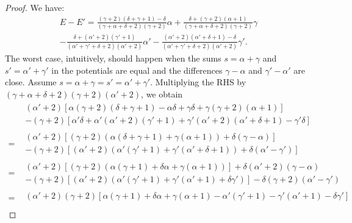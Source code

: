 \documentclass[version=3.21, pagesize, twoside=off, bibliography=totoc, DIV=calc, fontsize=12pt, a4paper]{scrartcl}
\begin{document}
\begin{proof}
	We have:
	\begin{multline}
		E - E' = \frac{(\gamma + 2) (\delta + \gamma + 1) - \delta}{(\gamma + \alpha + \delta + 2) (\gamma + 2)} \alpha 
		+ \frac{\delta + (\gamma + 2) (\alpha + 1)}{(\gamma + \alpha + \delta + 2) (\gamma + 2)} \gamma \\
		- \frac{\delta + (\alpha' + 2) (\gamma' + 1)}{(\alpha' + \gamma' + \delta + 2) (\alpha' + 2)} \alpha' 
		- \frac{(\alpha' + 2) (\alpha' + \delta + 1) - \delta}{(\alpha' + \gamma' + \delta + 2) (\alpha' + 2)} \gamma'.
	\end{multline}
	The worst case, intuitively, should happen when the sums $s = \alpha + \gamma$ and $s' = \alpha' + \gamma'$ in the potentials are equal and the differences $\gamma - \alpha$ and $\gamma' - \alpha'$ are close.
	Assume $s = \alpha + \gamma = s' = \alpha' + \gamma'$.
	Multiplying the RHS by $(\gamma + \alpha + \delta + 2) (\gamma + 2) (\alpha' + 2)$, we obtain
	\begin{align}
		& \begin{split}
			(\alpha' + 2) [\alpha (\gamma + 2) (\delta + \gamma + 1) - \alpha \delta + \gamma \delta + \gamma (\gamma + 2) (\alpha + 1)]\\
			- (\gamma + 2) [\alpha' \delta + \alpha' (\alpha' + 2) (\gamma' + 1) + \gamma' (\alpha' + 2) (\alpha' + \delta + 1) - \gamma' \delta]
		\end{split}\\
		= {} & \begin{split}
			(\alpha' + 2) [(\gamma + 2) (\alpha (\delta + \gamma + 1) + \gamma (\alpha + 1)) + \delta (\gamma - \alpha)]\\
			- (\gamma + 2) [(\alpha' + 2) (\alpha' (\gamma' + 1) + \gamma' (\alpha' + \delta + 1)) + \delta (\alpha' - \gamma')]
		\end{split}\\
		= {} & \begin{split}
			(\alpha' + 2) [(\gamma + 2) (\alpha (\gamma + 1) + \delta \alpha + \gamma (\alpha + 1))] + \delta (\alpha' + 2) (\gamma - \alpha)\\
			- (\gamma + 2) [(\alpha' + 2) (\alpha' (\gamma' + 1) + \gamma' (\alpha' + 1) + \delta \gamma')] - \delta (\gamma + 2) (\alpha' - \gamma')
		\end{split}\\
		= {} & \begin{split}
			(\alpha' + 2) (\gamma + 2) [\alpha (\gamma + 1) + \delta \alpha + \gamma (\alpha + 1) - \alpha' (\gamma' + 1) - \gamma' (\alpha' + 1) - \delta \gamma']\\

\end{split}
\end{align}
\end{proof}
\end{document}
